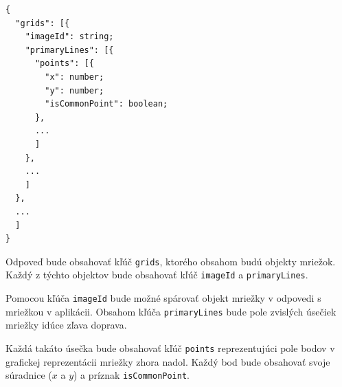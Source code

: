 \begin{minipage}[]{\linewidth}
\begin{verbatim}
{
  "grids": [{
    "imageId": string;
    "primaryLines": [{
      "points": [{
        "x": number;
        "y": number;
        "isCommonPoint": boolean;
      },
      ...
      ]
    },
    ...
    ]
  },
  ...
  ]
}
\end{verbatim}
\end{minipage}

Odpoveď bude obsahovať kľúč \texttt{grids}, ktorého obsahom budú objekty mriežok. Každý z týchto objektov bude obsahovať kľúč \texttt{imageId} a \texttt{primaryLines}.

Pomocou kľúča \texttt{imageId} bude možné spárovať objekt mriežky v odpovedi s mriežkou v aplikácii. Obsahom kľúča \texttt{primaryLines} bude pole zvislých úsečiek mriežky idúce zľava doprava.

Každá takáto úsečka bude obsahovať kľúč \texttt{points} reprezentujúci pole bodov v grafickej reprezentácii mriežky zhora nadol. Každý bod bude obsahovať svoje súradnice ($x$ a $y$) a príznak \texttt{isCommonPoint}.